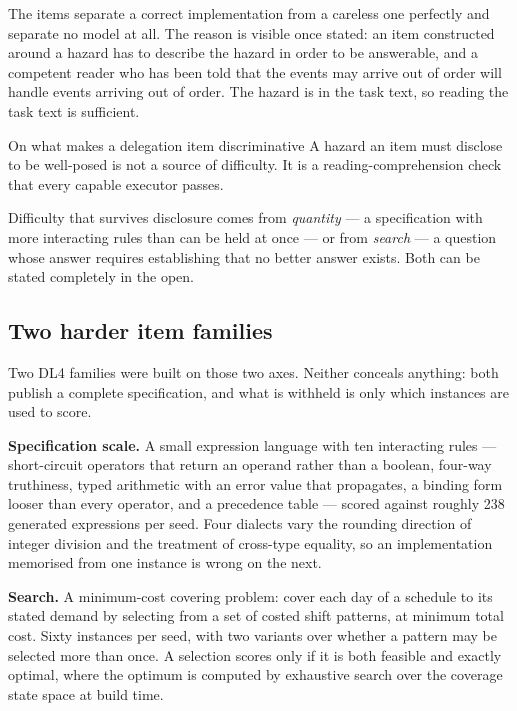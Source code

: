 \documentclass[11pt]{article}
\theoremstyle{definition}
\begin{document}
The items separate a correct implementation from a careless one perfectly and separate no model at all. The reason is visible once stated: an item constructed around a hazard has to describe the hazard in order to be answerable, and a competent reader who has been told that the events may arrive out of order will handle events arriving out of order. The hazard is in the task text, so reading the task text is sufficient.

\begin{claimbox}{On what makes a delegation item discriminative}
A hazard an item must disclose to be well-posed is not a source of difficulty. It is a reading-comprehension check that every capable executor passes.

Difficulty that survives disclosure comes from \emph{quantity} --- a specification with more interacting rules than can be held at once --- or from \emph{search} --- a question whose answer requires establishing that no better answer exists. Both can be stated completely in the open.
\end{claimbox}

\subsection{Two harder item families}\label{sec:t4}

Two DL4 families were built on those two axes. Neither conceals anything: both publish a complete specification, and what is withheld is only which instances are used to score.

\textbf{Specification scale.} A small expression language with ten interacting rules --- short-circuit operators that return an operand rather than a boolean, four-way truthiness, typed arithmetic with an error value that propagates, a binding form looser than every operator, and a precedence table --- scored against roughly 238 generated expressions per seed. Four dialects vary the rounding direction of integer division and the treatment of cross-type equality, so an implementation memorised from one instance is wrong on the next.

\textbf{Search.} A minimum-cost covering problem: cover each day of a schedule to its stated demand by selecting from a set of costed shift patterns, at minimum total cost. Sixty instances per seed, with two variants over whether a pattern may be selected more than once. A selection scores only if it is both feasible and exactly optimal, where the optimum is computed by exhaustive search over the coverage state space at build time.
\end{document}
